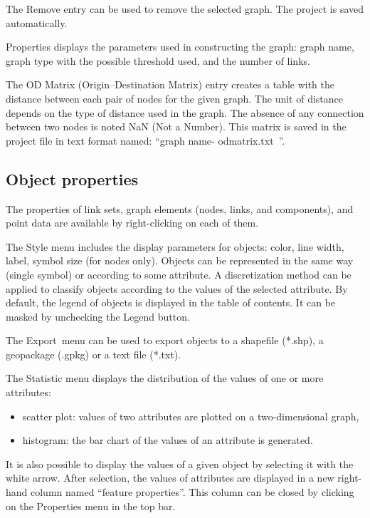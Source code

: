 \documentclass{article}
\begin{document}
The Remove entry can be used to remove the selected graph. The project is saved automatically.

Properties displays the parameters used in constructing the graph: graph name, graph type with the possible threshold used, and the number of links.

The OD Matrix (Origin–Destination Matrix) entry creates a table with the distance between each pair of nodes for the given graph. The unit of distance depends on the type of distance used in the graph. The absence of any connection between two nodes is noted NaN (Not a Number). This matrix is saved in the project file in text format named: “graph name-
odmatrix.txt~”.

\subsection{Object properties}
\label{properties}
The properties of link sets, graph elements (nodes, links, and components), and point data are available by right-clicking on each of them.

The Style menu includes the display parameters for objects: color, line width, label, symbol size (for nodes only). Objects can be represented in the same way (single symbol) or according to some attribute. A discretization method can be applied to classify objects according to the values of the selected attribute. By default, the legend of objects is displayed in the table of contents. It can be masked by unchecking
the Legend button.

The Export~menu can be used to export objects to a shapefile (*.shp), a geopackage (.gpkg) or a text file (*.txt).

The Statistic menu displays the distribution of the values of one or more attributes:
\begin{itemize}
	\item scatter plot: values of two attributes are plotted on a two-dimensional graph,
	\item histogram: the bar chart of the values of an attribute is generated.
\end{itemize}

It is also possible to display the values of a given object by selecting it with the white arrow. After selection, the values of attributes are displayed in a new right-hand column named “feature properties”. This column can be closed by clicking on the Properties menu in the top bar.
\end{document}
